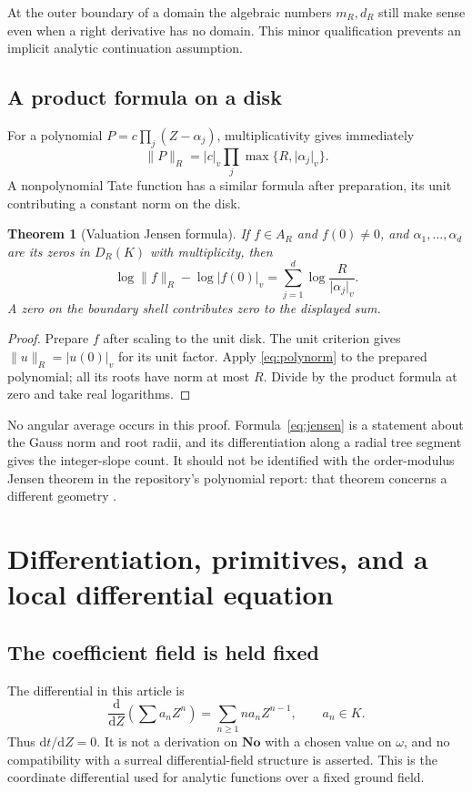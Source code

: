 \documentclass[11pt,a4paper]{article}
\numberwithin{equation}{section}
\newtheorem{theorem}{Theorem}[section]
\theoremstyle{definition}
\theoremstyle{remark}
\newcommand{\No}{\mathbf{No}}
\newcommand{\vabs}[1]{\lvert#1\rvert_v}
\newcommand{\Gauss}[2]{\lVert#1\rVert_{#2}}
\begin{document}
At the outer boundary of a domain the algebraic numbers $m_R,d_R$ still make
sense even when a right derivative has no domain. This minor qualification
prevents an implicit analytic continuation assumption.

\subsection{A product formula on a disk}
For a polynomial $P=c\prod_j(Z-\alpha_j)$, multiplicativity gives immediately
\begin{equation}\label{eq:polynorm}
 \Gauss PR=\vabs c\prod_j\max\{R,\vabs{\alpha_j}\}.
\end{equation}
A nonpolynomial Tate function has a similar formula after preparation, its
unit contributing a constant norm on the disk.

\begin{theorem}[Valuation Jensen formula]\label{thm:jensen}
If $f\in A_R$ and $f(0)\ne0$, and $\alpha_1,\ldots,\alpha_d$ are its zeros
in $D_R(K)$ with multiplicity, then
\begin{equation}\label{eq:jensen}
 \log\Gauss fR-\log\vabs{f(0)}
   =\sum_{j=1}^d\log\frac{R}{\vabs{\alpha_j}}.
\end{equation}
A zero on the boundary shell contributes zero to the displayed sum.
\end{theorem}
\begin{proof}
Prepare $f$ after scaling to the unit disk. The unit criterion gives
$\Gauss uR=\vabs{u(0)}$ for its unit factor. Apply
\eqref{eq:polynorm} to the prepared polynomial; all its roots have norm at most
$R$. Divide by the product formula at zero and take real logarithms.
\end{proof}

No angular average occurs in this proof. Formula~\eqref{eq:jensen} is a
statement about the Gauss norm and root radii, and its differentiation along a
radial tree segment gives the integer-slope count. It should not be identified
with the order-modulus Jensen theorem in the repository's polynomial report:
that theorem concerns a different geometry \cite{RepoPolynomial}.

\section{Differentiation, primitives, and a local differential equation}
\label{sec:differential}

\subsection{The coefficient field is held fixed}
The differential in this article is
\[
 \frac{\mathrm d}{\mathrm dZ}\left(\sum a_nZ^n\right)
   =\sum_{n\ge1}n a_nZ^{n-1},\qquad a_n\in K.
\]
Thus $\mathrm dt/\mathrm dZ=0$. It is not a derivation on $\No$ with a chosen
value on $\omega$, and no compatibility with a surreal differential-field
structure is asserted. This is the coordinate differential used for analytic
functions over a fixed ground field.
\end{document}
